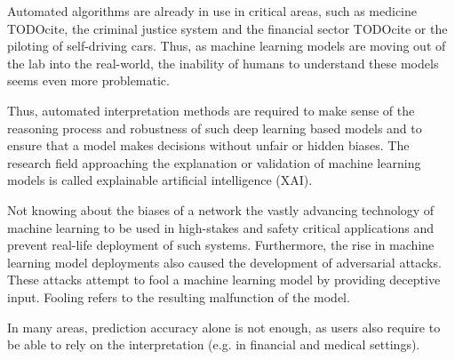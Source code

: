 Automated algorithms are already in use in critical areas, such as medicine TODOcite, the criminal justice system \cite{chouldechova2017fair} and the financial sector TODOcite or the piloting of self-driving cars.
Thus, as machine learning models are moving out of the lab into the real-world, the inability of humans to understand these models seems even more problematic. 

Thus, automated interpretation methods are required to make sense of the reasoning process and robustness of such deep learning based models and to ensure that a model makes decisions without unfair or hidden biases. 
The research field approaching the explanation or validation of machine learning models is called explainable artificial intelligence (XAI).


Not knowing about the biases of a network the vastly advancing technology of machine learning to be used in high-stakes and safety critical applications and prevent real-life deployment of such systems. 
Furthermore, the rise in machine learning model deployments also caused the development of adversarial attacks. These attacks attempt to fool a machine learning model by providing deceptive input. Fooling refers to the resulting malfunction of the model. 

In many areas, prediction accuracy alone is not enough, as users also require to be able to rely on the interpretation (e.g. in financial and medical settings).

















